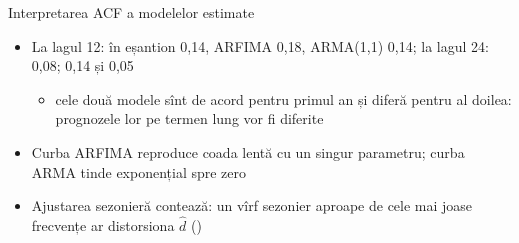 \begin{frame}{Interpretarea ACF a modelelor estimate}
\itemsize{\small}
\begin{itemize}
    \item La lagul 12: în eșantion 0{,}14, ARFIMA 0{,}18, ARMA(1,1) 0{,}14; la lagul 24: 0{,}08; 0{,}14 și 0{,}05
    \begin{itemize}
        \item cele două modele sînt de acord pentru primul an și diferă pentru al doilea: prognozele lor pe termen lung vor fi diferite
    \end{itemize}
    \item Curba ARFIMA reproduce coada lentă cu un singur parametru; curba ARMA tinde exponențial spre zero
    \item Ajustarea sezonieră contează: un vîrf sezonier aproape de cele mai joase frecvențe ar distorsiona $\hat d$ ()
\end{itemize}
\end{frame}

